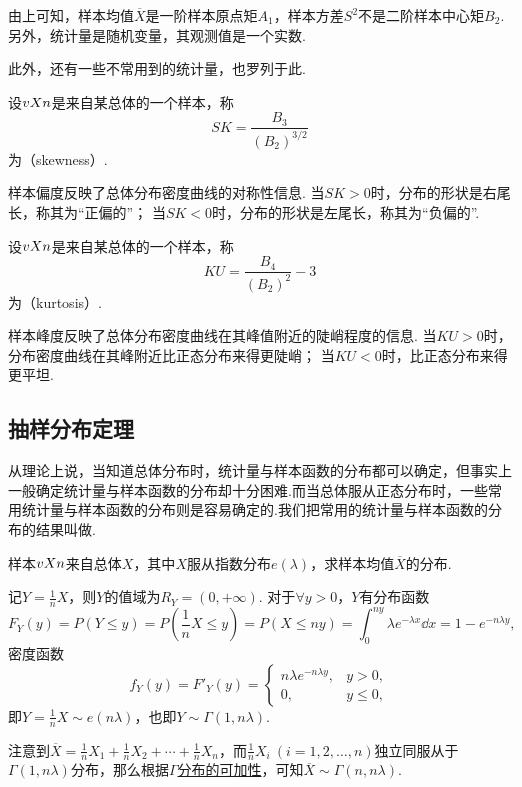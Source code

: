 由上可知，样本均值\(\overline{X}\)是一阶样本原点矩\(A_1\)，样本方差\(S^2\)不是二阶样本中心矩\(B_2\).
另外，统计量是随机变量，其观测值是一个实数.

此外，还有一些不常用到的统计量，也罗列于此.
\begin{definition}
设\(v{X}{n}\)是来自某总体的一个样本，称\begin{equation}
SK = \frac{B_3}{(B_2)^{3/2}}
\end{equation}为（skewness）.
\end{definition}
样本偏度反映了总体分布密度曲线的对称性信息.
当\(SK > 0\)时，分布的形状是右尾长，称其为“正偏的”；
当\(SK < 0\)时，分布的形状是左尾长，称其为“负偏的”.

\begin{definition}
设\(v{X}{n}\)是来自某总体的一个样本，称\begin{equation}
KU = \frac{B_4}{(B_2)^2} - 3
\end{equation}为（kurtosis）.
\end{definition}
样本峰度反映了总体分布密度曲线在其峰值附近的陡峭程度的信息.
当\(KU > 0\)时，分布密度曲线在其峰附近比正态分布来得更陡峭；
当\(KU < 0\)时，比正态分布来得更平坦.

\subsection{抽样分布定理}
从理论上说，当知道总体分布时，统计量与样本函数的分布都可以确定，但事实上一般确定统计量与样本函数的分布却十分困难.而当总体服从正态分布时，一些常用统计量与样本函数的分布则是容易确定的.我们把常用的统计量与样本函数的分布的结果叫做.

\begin{example}
样本\(v{X}{n}\)来自总体\(X\)，其中\(X\)服从指数分布\(e(\lambda)\)，求样本均值\(\overline{X}\)的分布.
\begin{solution}
记\(Y = \frac{1}{n} X\)，则\(Y\)的值域为\(R_Y = (0,+\infty)\).
对于\(\forall y>0\)，\(Y\)有分布函数\[
F_Y(y) = P(Y \leqslant y)
= P\left(\frac{1}{n} X \leqslant y\right)
= P(X \leqslant ny)
= \int_0^{ny} \lambda e^{-\lambda x} \dd{x}
= 1 - e^{-n\lambda y},
\]密度函数\[
f_Y(y) = F'_Y(y) = \left\{ \begin{array}{lc}
n\lambda e^{-n\lambda y}, & y>0, \\
0, & y \leqslant 0,
\end{array} \right.
\]即\(Y=\frac{1}{n}X \sim e(n\lambda)\)，也即\(Y \sim \Gamma(1,n\lambda)\).

注意到\(\overline{X} = \frac{1}{n} X_1 + \frac{1}{n} X_2 + \dotsb + \frac{1}{n} X_n\)，而\(\frac{1}{n} X_i\ (i=1,2,\dotsc,n)\)独立同服从于\(\Gamma(1,n\lambda)\)分布，那么根据\hyperref[theorem:多维随机变量及其分布.伽马分布的可加性1]{\(\Gamma\)分布的可加性}，可知\(\overline{X} \sim \Gamma(n,n\lambda)\).
\end{solution}
\end{example}

